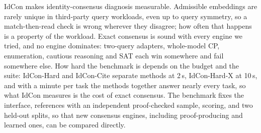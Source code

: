 IdCon makes identity-consensus diagnosis measurable. Admissible embeddings are rarely unique in third-party query workloads, even up to query symmetry, so a match-then-read check is wrong wherever they disagree; how often that happens is a property of the workload. Exact consensus is sound with every engine we tried, and no engine dominates: two-query adapters, whole-model CP, enumeration, cautious reasoning and SAT each win somewhere and fail somewhere else. How hard the benchmark is depends on the budget and the suite: IdCon-Hard and IdCon-Cite separate methods at 2\,s, IdCon-Hard-X at 10\,s, and with a minute per task the methods together answer nearly every task, so what IdCon measures is the cost of exact consensus. The benchmark fixes the interface, references with an independent proof-checked sample, scoring, and two held-out splits, so that new consensus engines, including proof-producing and learned ones, can be compared directly.
